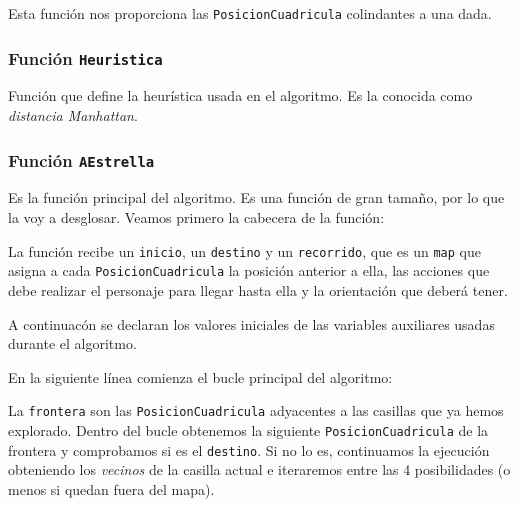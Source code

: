 \documentclass[11pt,a4paper]{article}
\begin{document}
Esta función nos proporciona las \texttt{PosicionCuadricula} colindantes a una dada.



\subsubsection*{Función \texttt{Heuristica} }%
\label{sub:funcion_heuristica}

Función que define la heurística usada en el algoritmo. Es la conocida como \textit{distancia Manhattan}.



\subsubsection*{Función \texttt{AEstrella} }%
\label{sub:funcion_aestrella_}

Es la función principal del algoritmo. Es una función de gran tamaño, por lo que la voy a desglosar. Veamos primero la cabecera de la función:



La función recibe un \texttt{inicio}, un \texttt{destino} y un \texttt{recorrido}, que es un \texttt{map} que asigna a cada \texttt{PosicionCuadricula} la posición anterior a ella, las acciones que debe realizar el personaje para llegar hasta ella y la orientación que deberá tener.

A continuacón se declaran los valores iniciales de las variables auxiliares usadas durante el algoritmo.


En la siguiente línea comienza el bucle principal del algoritmo:



La \texttt{frontera} son las \texttt{PosicionCuadricula} adyacentes a las casillas que ya hemos explorado. Dentro del bucle obtenemos la siguiente \texttt{PosicionCuadricula} de la frontera y comprobamos si es el \texttt{destino}. Si no lo es, continuamos la ejecución obteniendo los \textit{vecinos} de la casilla actual e iteraremos entre las 4 posibilidades (o menos si quedan fuera del mapa).
\end{document}
